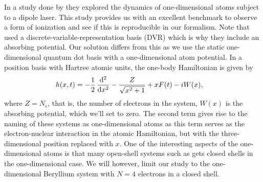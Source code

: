         In a study done by \citeauthor{miyagi_and_madsen}
        \cite{miyagi_and_madsen} they explored the dynamics of one-dimensional
        atoms subject to a dipole laser.
        This study provides us with an excellent benchmark to observe a form
        of ionization and see if this is reproducible in our formalism.
        Note that \citeauthor{miyagi_and_madsen} used a
        discrete-variable-representation basis (DVR) which is why they include
        an absorbing potential.
        Our solution differs from this as we use the static one-dimensional
        quantum dot basis with a one-dimensional atom potential.
        In a position basis with Hartree atomic units, the one-body
        Hamiltonian is given by \cite{miyagi_and_madsen}
        \begin{align}
            \oneten(x, t)
            &= -\half \dod[2]{}{x}
            - \frac{Z}{\sqrt{x^2 + 1}}
            + xF(t)
            - iW(x),
        \end{align}
        where $Z = N_e$, that is, the number of electrons in the system,
        $W(x)$ is the absorbing potential, which we'll set to zero.
        The second term gives rise to the naming of these systems as
        one-dimensional atoms as this term serves as the electron-nuclear
        interaction in the atomic Hamiltonian, but with the three-dimensional
        position replaced with $x$.
        One of the interesting aspects of the one-dimensional atoms is that many
        open-shell systems such as  gets closed shells in the
        one-dimensional case.
        We will however, limit our study to the one-dimensional Beryllium
        system with $N = 4$ electrons in a closed shell.

